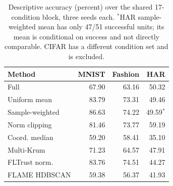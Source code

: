 \begin{table}[!t]
\centering\footnotesize
\caption{Descriptive accuracy (percent) over the shared 17-condition block, three seeds each. $^{*}$HAR sample-weighted mean has only 47/51 successful units; its mean is conditional on success and not directly comparable. CIFAR has a different condition set and is excluded.}\label{tab:accuracy}
\begin{tabular}{lrrr}
\toprule
Method & MNIST & Fashion & HAR \\
\midrule
Full & 67.90 & 63.16 & 50.32 \\
Uniform mean & 83.79 & 73.31 & 49.46 \\
Sample-weighted & 86.63 & 74.22 & 49.59$^{*}$ \\
Norm clipping & 81.46 & 73.77 & 59.19 \\
Coord. median & 59.20 & 58.41 & 35.10 \\
Multi-Krum & 71.23 & 64.57 & 47.91 \\
FLTrust norm. & 83.76 & 74.51 & 44.27 \\
FLAME HDBSCAN & 59.38 & 56.37 & 41.93 \\
\bottomrule
\end{tabular}
\end{table}
